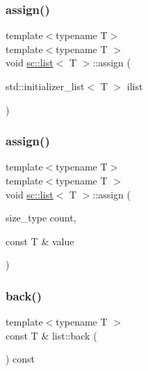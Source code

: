 \mbox{\label{classsc_1_1list_a4aa5ed764ec08bf8250d5dc65df8d4a5}} 
\subsubsection{\texorpdfstring{assign()}{assign()}\hspace{0.1cm}{\footnotesize\ttfamily [5/6]}}
{\footnotesize\ttfamily template$<$typename T$>$ \\
template$<$typename T $>$ \\
void \mbox{\hyperlink{classsc_1_1list}{sc\+::list}}$<$ T $>$\+::assign (\begin{DoxyParamCaption}\item[{std\+::initializer\+\_\+list$<$ T $>$}]{ilist }\end{DoxyParamCaption})}

\mbox{\label{classsc_1_1list_ac1e81764b779171186a3970cb1b3d288}} 
\subsubsection{\texorpdfstring{assign()}{assign()}\hspace{0.1cm}{\footnotesize\ttfamily [6/6]}}
{\footnotesize\ttfamily template$<$typename T$>$ \\
template$<$typename T $>$ \\
void \mbox{\hyperlink{classsc_1_1list}{sc\+::list}}$<$ T $>$\+::assign (\begin{DoxyParamCaption}\item[{size\+\_\+type}]{count,  }\item[{const T \&}]{value }\end{DoxyParamCaption})}

\mbox{\label{classsc_1_1list_a57f6bddf67f5d60b5d3293150fbb52a6}} 
\subsubsection{\texorpdfstring{back()}{back()}}
{\footnotesize\ttfamily template$<$typename T $>$ \\
const T \& list\+::back (\begin{DoxyParamCaption}{ }\end{DoxyParamCaption}) const}

